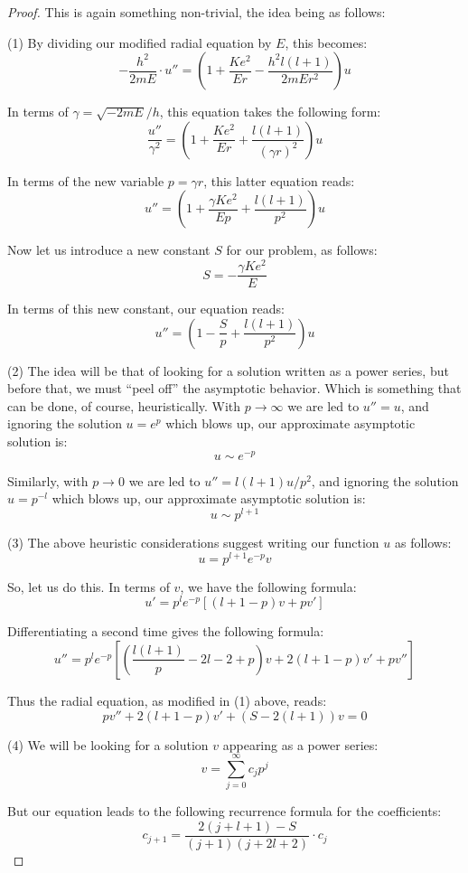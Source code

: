 \documentclass[12pt]{amsbook}
\begin{document}
\begin{proof}
This is again something non-trivial, the idea being as follows:

\medskip

(1) By dividing our modified radial equation by $E$, this becomes:
$$-\frac{h^2}{2mE}\cdot u''=\left(1+\frac{Ke^2}{Er}-\frac{h^2l(l+1)}{2mEr^2}\right)u$$

In terms of $\gamma=\sqrt{-2mE}/h$, this equation takes the following form:
$$\frac{u''}{\gamma^2}=\left(1+\frac{Ke^2}{Er}+\frac{l(l+1)}{(\gamma r)^2}\right)u$$

In terms of the new variable $p=\gamma r$, this latter equation reads:
$$u''=\left(1+\frac{\gamma Ke^2}{Ep}+\frac{l(l+1)}{p^2}\right)u$$

Now let us introduce a new constant $S$ for our problem, as follows:
$$S=-\frac{\gamma Ke^2}{E}$$

In terms of this new constant, our equation reads:
$$u''=\left(1-\frac{S}{p}+\frac{l(l+1)}{p^2}\right)u$$

(2) The idea will be that of looking for a solution written as a power series, but before that, we must ``peel off'' the asymptotic behavior. Which is something that can be done, of course, heuristically. With $p\to\infty$ we are led to $u''=u$, and ignoring the solution $u=e^p$ which blows up, our approximate asymptotic solution is:
$$u\sim e^{-p}$$

Similarly, with $p\to0$ we are led to $u''=l(l+1)u/p^2$, and ignoring the solution $u=p^{-l}$ which blows up, our approximate asymptotic solution is:
$$u\sim p^{l+1}$$

(3) The above heuristic considerations suggest writing our function $u$ as follows:
$$u=p^{l+1}e^{-p}v$$

So, let us do this. In terms of $v$, we have the following formula:
$$u'=p^le^{-p}\left[(l+1-p)v+pv'\right]$$

Differentiating a second time gives the following formula:
$$u''=p^le^{-p}\left[\left(\frac{l(l+1)}{p}-2l-2+p\right)v+2(l+1-p)v'+pv''\right]$$

Thus the radial equation, as modified in (1) above, reads:
$$pv''+2(l+1-p)v'+(S-2(l+1))v=0$$

(4) We will be looking for a solution $v$ appearing as a power series:
$$v=\sum_{j=0}^\infty c_jp^j$$

But our equation leads to the following recurrence formula for the coefficients:
$$c_{j+1}=\frac{2(j+l+1)-S}{(j+1)(j+2l+2)}\cdot c_j$$


\end{proof}
\end{document}
